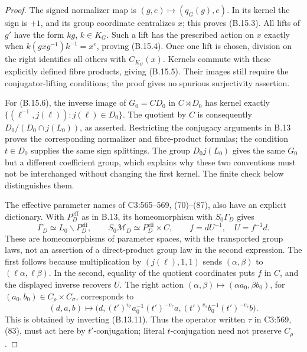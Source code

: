 \begin{proof}
The signed normalizer map is \((g,e)\mapsto(q_G(g),e)\).
In its kernel the sign is \(+1\), and its group coordinate
centralizes \(x\); this proves (B.15.3). All lifts of \(g'\)
have the form \(kg\), \(k\in K_G\). Such a lift has the
prescribed action on \(x\) exactly when
\(k(gxg^{-1})k^{-1}=x^e\), proving (B.15.4).
Once one lift is chosen, division on the right identifies all
others with \(C_{K_G}(x)\). Kernels commute with these explicitly
defined fibre products, giving (B.15.5). Their images still require
the conjugator-lifting conditions; the proof gives no spurious
surjectivity assertion.

For (B.15.6), the inverse image of \(G_0=CD_0\) in
\(C\rtimes D_0\) has kernel exactly
\(\{(\ell^{-1},j(\ell)):j(\ell)\in D_0\}\).
The quotient by \(C\) is consequently
\(D_0/(D_0\cap j(L_0))\), as asserted. Restricting the
conjugacy arguments in B.13 proves the corresponding normalizer
and fibre-product formulas; the condition \(t\in D_0\) supplies
the same sign splittings. The group \(D_0j(L_0)\) gives the same
\(G_0\) but a different coefficient group, which explains why
these two conventions must not be interchanged without changing
the first kernel. The finite check below distinguishes them.

The effective parameter names of C3:565--569, (70)--(87), also
have an explicit dictionary. With \(P_D^{\mathrm{eff}}\) as
in B.13, its homeomorphism with \(S_0\Gamma_D\) gives
\[
 \Gamma_D\simeq L_0\backslash P_D^{\mathrm{eff}},\qquad
 S_0\mathcal M_D\simeq P_D^{\mathrm{eff}}\times C,
 \qquad f=dU^{-1},\quad U=f^{-1}d.
 \tag{B.15.6a}
\]
These are homeomorphisms of parameter spaces, with the transported
group laws, not an assertion of a direct-product group law in the
second expression. The first follows because multiplication by
\((j(\ell),1,1)\) sends \((\alpha,\beta)\) to
\((\ell\alpha,\ell\beta)\). In the second, equality of the
quotient coordinates puts \(f\) in \(C\), and the displayed
inverse recovers \(U\). The right action
\((\alpha,\beta)\mapsto(\alpha a_0,\beta b_0)\), for
\((a_0,b_0)\in C_\rho\times C_\sigma\), corresponds to
\[
 (d,a,b)\longmapsto
 \bigl(d,(t')^{v_r}a_0^{-1}(t')^{-v_r}a,
          (t')^{v_s}b_0^{-1}(t')^{-v_s}b\bigr).
 \tag{B.15.6b}
\]
This is obtained by inverting (B.13.11). Thus the operator written
\(\tau\) in C3:569, (83), must act here by \(t'\)-conjugation;
literal \(t\)-conjugation need not preserve \(C_\rho\).


\end{proof}
